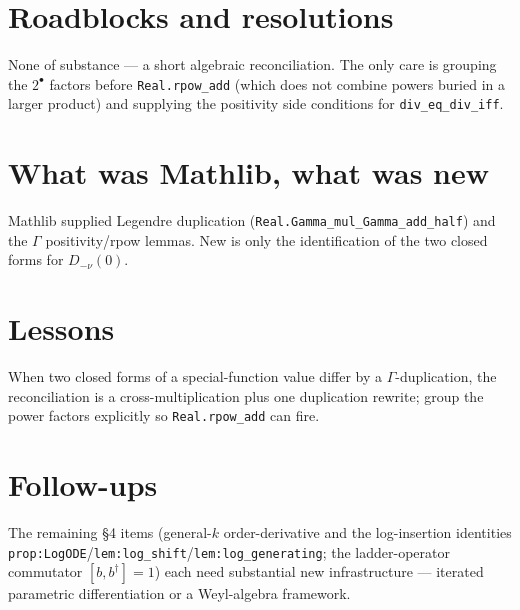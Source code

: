 \documentclass[11pt]{article}
\begin{document}
\section{Roadblocks and resolutions}
None of substance --- a short algebraic reconciliation. The only care is grouping the $2^{\bullet}$
factors before \texttt{Real.rpow\_add} (which does not combine powers buried in a larger product) and
supplying the positivity side conditions for \texttt{div\_eq\_div\_iff}.

\section{What was Mathlib, what was new}
Mathlib supplied Legendre duplication (\texttt{Real.Gamma\_mul\_Gamma\_add\_half}) and the $\Gamma$
positivity/rpow lemmas. New is only the identification of the two closed forms for $D_{-\nu}(0)$.

\section{Lessons}
When two closed forms of a special-function value differ by a $\Gamma$-duplication, the reconciliation
is a cross-multiplication plus one duplication rewrite; group the power factors explicitly so
\texttt{Real.rpow\_add} can fire.

\section{Follow-ups}
The remaining \S4 items (general-$k$ order-derivative and the log-insertion identities
\texttt{prop:LogODE}/\texttt{lem:log\_shift}/\texttt{lem:log\_generating}; the ladder-operator commutator
$[b,b^\dagger]=1$) each need substantial new infrastructure --- iterated parametric differentiation or a
Weyl-algebra framework.
\end{document}
